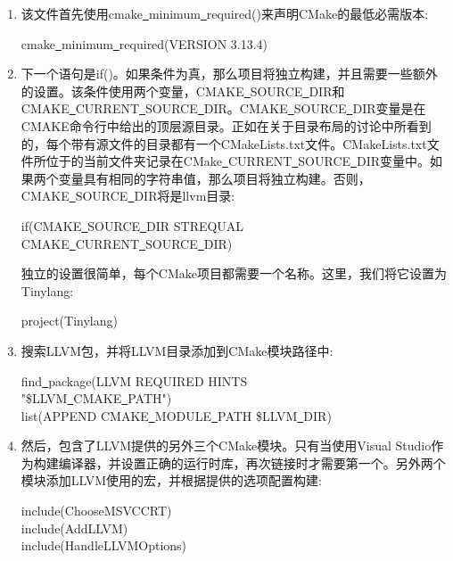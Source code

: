 \begin{enumerate}
	\item 该文件首先使用cmake\underline{~}minimum\underline{~}required()来声明CMake的最低必需版本:
	\begin{tcolorbox}[colback=white,colframe=black]
		cmake\underline{~}minimum\underline{~}required(VERSION 3.13.4)
	\end{tcolorbox}
 	\item 下一个语句是if()。如果条件为真，那么项目将独立构建，并且需要一些额外的设置。该条件使用两个变量，CMAKE\underline{~}SOURCE\underline{~}DIR和CMAKE\underline{~}CURRENT\underline{~}SOURCE\underline{~}DIR。CMAKE\underline{~}SOURC\allowbreak E\underline{~}DIR变量是在CMAKE命令行中给出的顶层源目录。正如在关于目录布局的讨论中所看到的，每个带有源文件的目录都有一个CMakeLists.txt文件。CMakeLists.txt文件所位于的当前文件夹记录在CMake\underline{~}CURRENT\underline{~}SOURCE\underline{~}DIR变量中。如果两个变量具有相同的字符串值，那么项目将独立构建。否则，CMAKE\underline{~}SOURCE\underline{~}DIR将是llvm目录:
 	\begin{tcolorbox}[colback=white,colframe=black]
 		if(CMAKE\underline{~}SOURCE\underline{~}DIR STREQUAL CMAKE\underline{~}CURRENT\underline{~}SOURCE\underline{~}DIR)
 	\end{tcolorbox}
 	独立的设置很简单，每个CMake项目都需要一个名称。这里，我们将它设置为Tinylang:
 	\begin{tcolorbox}[colback=white,colframe=black]
 		project(Tinylang)
 	\end{tcolorbox}
 	\item 搜索LLVM包，并将LLVM目录添加到CMake模块路径中:
 	\begin{tcolorbox}[colback=white,colframe=black]
 		find\underline{~}package(LLVM REQUIRED HINTS \\
 		\hspace*{0.5cm}"\${LLVM\underline{~}CMAKE\underline{~}PATH}") \\
 		list(APPEND CMAKE\underline{~}MODULE\underline{~}PATH \${LLVM\underline{~}DIR})
 	\end{tcolorbox}
 	\item 然后，包含了LLVM提供的另外三个CMake模块。只有当使用Visual Studio作为构建编译器，并设置正确的运行时库，再次链接时才需要第一个。另外两个模块添加LLVM使用的宏，并根据提供的选项配置构建:
 	\begin{tcolorbox}[colback=white,colframe=black]
 		include(ChooseMSVCCRT) \\
 		include(AddLLVM) \\
 		include(HandleLLVMOptions)

\end{tcolorbox}
\end{enumerate}
